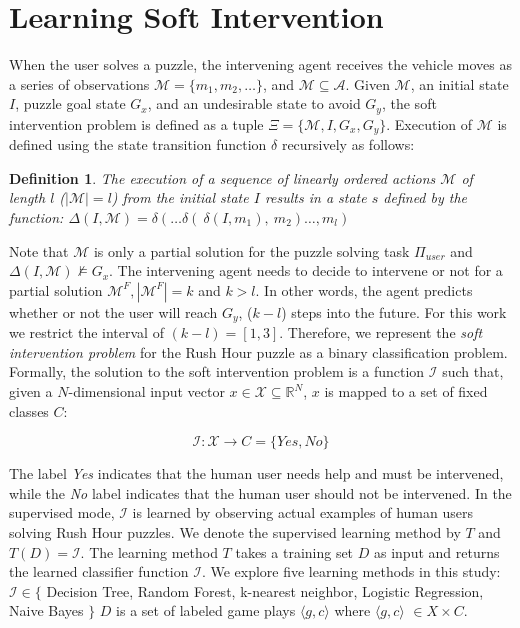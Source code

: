 \documentclass[doctor]{thesis} %
\theoremstyle{plain}
\newtheorem{definition}{Definition}
\begin{document}
\section*{Learning Soft Intervention} %
When the user solves a puzzle, the intervening agent receives the vehicle moves as a series of observations $\mathcal{M}=\lbrace m_1, m_2, \ldots \rbrace$, and $\mathcal{M} \subseteq \mathcal{A}$. Given $\mathcal{M}$, an initial state $I$, puzzle goal state $G_x$, and an undesirable state to avoid $G_y$, the soft intervention problem is defined as a tuple $\Xi=\lbrace \mathcal{M}, I, G_x, G_y\rbrace$. Execution of $\mathcal{M}$ is defined using the state transition function $\delta$ recursively as follows:

\begin{definition}
The execution of a sequence of linearly ordered actions $\mathcal{M}$ of length $l$ ($|\mathcal{M}|=l$) from the initial state $I$ results in a state $s$ defined by the function: $\Delta (I, \mathcal{M}) = \delta( \ldots \delta(\:\delta(I,m_1),\:m_2) \ldots, m_l)$
\end{definition}

Note that $\mathcal{M}$ is only a partial solution for the puzzle solving task $\Pi_{user}$ and $\Delta (I, \mathcal{M}) \not\models G_x$. The intervening agent needs to decide to intervene or not for a partial solution $\mathcal{M}^F, |\mathcal{M}^F|=k$ and $k>l$. In other words, the agent predicts whether or not the user will reach $G_y$, ($k-l$) steps into the future. For this work we restrict the interval of $(k-l)=[1,3]$. Therefore, we represent the \textit{soft intervention problem} for the Rush Hour puzzle as a binary classification problem. Formally, the solution to the soft intervention problem is a function $\mathcal{I}$ such that, given a $N$-dimensional input vector $x \in \mathcal{X} \subseteq \mathbb{R}^N$, $x$ is mapped to a set of fixed classes $C$:

\begin{equation}
\mathcal{I} : \mathcal{X} \to C=\lbrace Yes, No\rbrace
\end{equation}

The label \textit{Yes} indicates that the human user needs help and must be intervened, while the \textit{No} label indicates that the human user should not be intervened. In the supervised mode, $\mathcal{I}$ is learned by observing actual examples of human users solving Rush Hour puzzles. We denote the supervised learning method by $T$ and $T(D)=\mathcal{I}$. The learning method $T$ takes a training set $D$ as input and returns the learned classifier function $\mathcal{I}$. We explore five learning methods in this study: $\mathcal{I} \in \lbrace $ Decision Tree, Random Forest, k-nearest neighbor, Logistic Regression, Naive Bayes $\rbrace$  $D$ is a set of labeled game plays $\langle g, c\rangle$ where $\langle g, c\rangle$ $\in X \times C$. 
\end{document}
